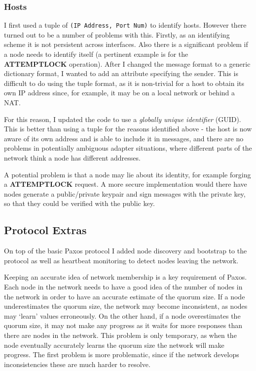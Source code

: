 \documentclass[12pt,twoside,notitlepage]{report}
\newcommand{\op}[1]  {{\bf #1}}         %
\begin{document}
\subsubsection*{Hosts}

I first used a tuple of \verb+(IP Address, Port Num)+ to identify hosts. However there turned out
to be a number of problems with this. Firstly, as an identifying scheme it is not persistent across
interfaces. Also there is a significant problem if a node needs to identify itself (a pertinent
example is for the \op{ATTEMPTLOCK} operation). After I changed the message format to a generic
dictionary format, I wanted to add an attribute specifying the sender. This is difficult to do
using the tuple format, as it is non-trivial for a host to obtain its own IP address since, for
example, it may be on a local network or behind a NAT.

For this reason, I updated the code to use a \emph{globally unique identifier} (GUID). This is
better than using a tuple for the reasons identified above - the host is now aware of its own
address and is able to include it in messages, and there are no problems in potentially ambiguous
adapter situations, where different parts of the network think a node has different addresses.

A potential problem is that a node may lie about its identity, for example forging a
\op{ATTEMPTLOCK} request. A more secure implementation would there have nodes generate a
public/private keypair and sign messages with the private key, so that they could be verified with
the public key.

\subsection{Protocol Extras}

On top of the basic Paxos protocol I added node discovery and bootstrap to the protocol as well as
heartbeat monitoring to detect nodes leaving the network.

Keeping an accurate idea of network membership is a key requirement of Paxos. Each node in the
network needs to have a good idea of the number of nodes in the network in order to have an
accurate estimate of the quorum size. If a node underestimates the quorum size, the network may
become inconsistent, as nodes may `learn' values erroneously. On the other hand, if a node
overestimates the quorum size, it may not make any progress as it waits for more responses than
there are nodes in the network. This problem is only temporary, as when the node eventually
accurately learns the quorum size the network will make progress. The first problem is more
problematic, since if the network develops inconsistencies these are much harder to resolve.
\end{document}
